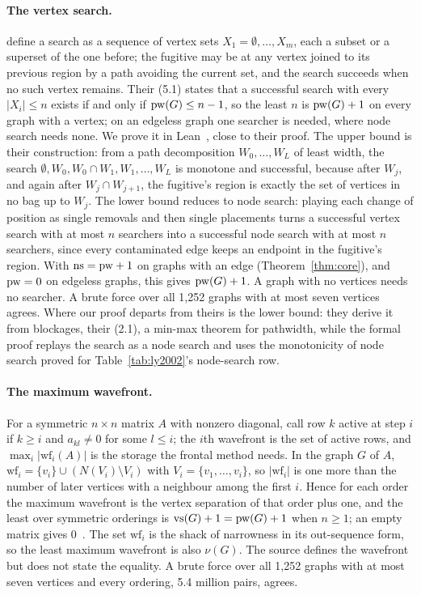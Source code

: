 \paragraph{The vertex search.} \citet[\S5]{BRST1991} define a search as a
sequence of vertex sets $X_1=\emptyset,\dots,X_m$, each a subset or a superset
of the one before; the fugitive may be at any vertex joined to its previous
region by a path avoiding the current set, and the search succeeds when no such
vertex remains. Their (5.1) states that a successful search with every
$|X_i|\le n$ exists if and only if $\mathrm{pw}(G)\le n-1$, so the least $n$ is
$\mathrm{pw}(G)+1$ on every graph with a vertex; on an edgeless graph one searcher is
needed, where node search needs none. We prove it in Lean~,
close to their proof. The upper bound is their construction: from a path decomposition
$W_0,\dots,W_L$ of least width, the search
$\emptyset,W_0,W_0\cap W_1,W_1,\dots,W_L$ is monotone and successful, because
after $W_j$, and again after $W_j\cap W_{j+1}$, the fugitive's region is
exactly the set of vertices in no bag up to $W_j$. The lower bound reduces to
node search: playing each change of position as single removals and then
single placements turns a successful vertex search with at most $n$ searchers
into a successful node search with at most $n$ searchers, since every
contaminated edge keeps an endpoint in the fugitive's region. With
$\mathrm{ns}=\mathrm{pw}+1$ on graphs with an edge (Theorem~\ref{thm:core}), and $\mathrm{pw}=0$ on
edgeless graphs, this gives $\mathrm{pw}(G)+1$. A graph with no vertices needs no
searcher. A brute force over all 1,252 graphs with at most seven vertices
agrees. Where our proof departs from theirs is the lower bound: they derive it
from blockages, their (2.1), a min-max theorem for pathwidth, while the formal
proof replays the search as a node search and uses the monotonicity of node
search proved for Table~\ref{tab:ly2002}'s node-search row.

\paragraph{The maximum wavefront.} For a symmetric $n\times n$ matrix $A$ with
nonzero diagonal, \citet[\S2.1]{KumfertPothen1997} call row $k$ active at step
$i$ if $k\ge i$ and $a_{kl}\ne0$ for some $l\le i$; the $i$th wavefront is the
set of active rows, and $\max_i|\mathrm{wf}_i(A)|$ is the storage the frontal
method needs. In the graph $G$ of $A$, $\mathrm{wf}_i=\{v_i\}\cup(N(V_i)\setminus
V_i)$ with $V_i=\{v_1,\dots,v_i\}$, so $|\mathrm{wf}_i|$ is one more than the
number of later vertices with a neighbour among the first $i$. Hence for each
order the maximum wavefront is the vertex separation of that order plus one,
and the least over symmetric orderings is $\mathrm{vs}(G)+1=\mathrm{pw}(G)+1$ when $n\ge1$; an
empty matrix gives 0~. The set $\mathrm{wf}_i$ is the
shack of narrowness in its out-sequence form, so the least maximum wavefront is
also $\nu(G)$. The source defines the wavefront but does not state the
equality. A brute force over all 1,252 graphs with at most seven vertices and
every ordering, 5.4 million pairs, agrees.

